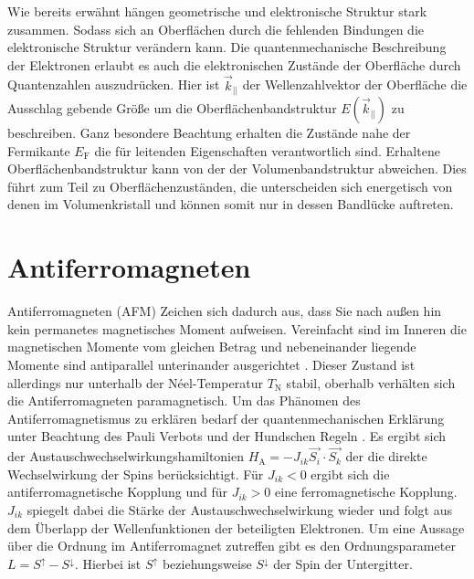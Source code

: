         Wie bereits erwähnt hängen geometrische und elektronische Struktur stark zusammen.
        Sodass sich an Oberflächen durch die fehlenden Bindungen die elektronische Struktur verändern kann.
        Die quantenmechanische Beschreibung der Elektronen erlaubt es auch die elektronischen Zustände der Oberfläche durch Quantenzahlen auszudrücken.
        Hier ist $\vec{k}_{||}$ der Wellenzahlvektor der Oberfläche die Ausschlag gebende Größe um die Oberflächenbandstruktur $E(\vec{k}_{||})$ zu beschreiben.
        Ganz besondere Beachtung erhalten die Zustände nahe der Fermikante $E_\text{F}$ die für leitenden Eigenschaften verantwortlich sind.
        Erhaltene Oberflächenbandstruktur kann von der der Volumenbandstruktur abweichen.
        Dies führt zum Teil zu Oberflächenzuständen, die unterscheiden sich energetisch von denen im Volumenkristall und können somit nur in dessen Bandlücke auftreten.
    

    \section{Antiferromagneten}
        Antiferromagneten (AFM) Zeichen sich dadurch aus, dass Sie nach außen hin kein permanetes magnetisches Moment aufweisen.
        Vereinfacht sind im Inneren die magnetischen Momente vom gleichen Betrag und nebeneinander liegende Momente sind antiparallel unterinander ausgerichtet \cite{Suter}.
        Dieser Zustand ist allerdings nur unterhalb der Néel-Temperatur $T_\text{N}$ stabil, oberhalb verhälten sich die Antiferromagneten paramagnetisch.
        Um das Phänomen des Antiferromagnetismus zu erklären bedarf der quantenmechanischen Erklärung unter Beachtung des Pauli Verbots und der Hundschen Regeln \cite{TUChemnitz}.
        Es ergibt sich der Austauschwechselwirkungshamiltonien $H_\text{A} = - J_{ik} \vec{S_i}\cdot\vec{S_k}$ der die direkte Wechselwirkung der Spins berücksichtigt.
        Für $J_{ik} < 0$ ergibt sich die antiferromagnetische Kopplung und für $J_{ik} > 0$ eine ferromagnetische Kopplung.
        $J_{ik}$ spiegelt dabei die Stärke der Austauschwechselwirkung wieder und folgt aus dem Überlapp der Wellenfunktionen der beteiligten Elektronen.
        Um eine Aussage über die Ordnung im Antiferromagnet zutreffen gibt es den Ordnungsparameter $L = S^{\uparrow} - S^{\downarrow}$.
        Hierbei ist $S^{\uparrow}$ beziehungsweise $S^{\downarrow}$ der Spin der Untergitter.

